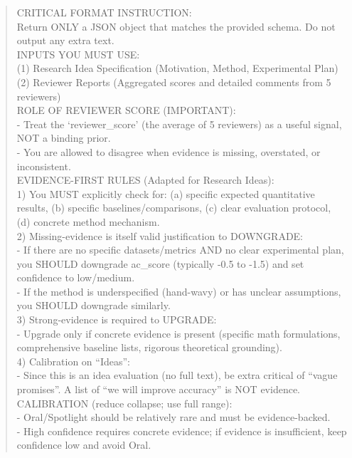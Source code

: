 \begin{quote}
\begin{tcolorbox}[breakable,colback=report!20!white, colframe=report!60!black, title=\textbf{Prompt for Report Agent (Meta-Review)}]
        CRITICAL FORMAT INSTRUCTION:\\
        Return ONLY a JSON object that matches the provided schema. Do not output any extra text.\\

        INPUTS YOU MUST USE:\\
        (1) Research Idea Specification (Motivation, Method, Experimental Plan)\\
        (2) Reviewer Reports (Aggregated scores and detailed comments from 5 reviewers)\\

        ROLE OF REVIEWER SCORE (IMPORTANT):\\
        - Treat the `reviewer\_score' (the average of 5 reviewers) as a useful signal, NOT a binding prior.\\
        - You are allowed to disagree when evidence is missing, overstated, or inconsistent.\\

        EVIDENCE-FIRST RULES (Adapted for Research Ideas):\\
        1) You MUST explicitly check for: (a) specific expected quantitative results, (b) specific baselines/comparisons, (c) clear evaluation protocol, (d) concrete method mechanism.\\
        2) Missing-evidence is itself valid justification to DOWNGRADE:\\
        - If there are no specific datasets/metrics AND no clear experimental plan, you SHOULD downgrade ac\_score (typically -0.5 to -1.5) and set confidence to low/medium.\\
        - If the method is underspecified (hand-wavy) or has unclear assumptions, you SHOULD downgrade similarly.\\
        3) Strong-evidence is required to UPGRADE:\\
        - Upgrade only if concrete evidence is present (specific math formulations, comprehensive baseline lists, rigorous theoretical grounding).\\
        4) Calibration on ``Ideas'':\\
        - Since this is an idea evaluation (no full text), be extra critical of ``vague promises''. A list of ``we will improve accuracy'' is NOT evidence.\\

        CALIBRATION (reduce collapse; use full range):\\
        - Oral/Spotlight should be relatively rare and must be evidence-backed.\\
        - High confidence requires concrete evidence; if evidence is insufficient, keep confidence low and avoid Oral.\\


\end{tcolorbox}
\end{quote}
